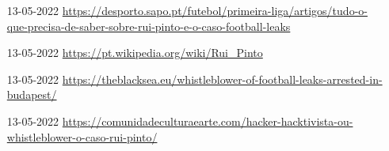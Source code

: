 

\begin{itemize}
    \item [13-05-2022] \url{https://desporto.sapo.pt/futebol/primeira-liga/artigos/tudo-o-que-precisa-de-saber-sobre-rui-pinto-e-o-caso-football-leaks}
    \item [13-05-2022] \url{https://pt.wikipedia.org/wiki/Rui_Pinto}
    \item [13-05-2022] \url{https://theblacksea.eu/whistleblower-of-football-leaks-arrested-in-budapest/}
    \item [13-05-2022] \url{https://comunidadeculturaearte.com/hacker-hacktivista-ou-whistleblower-o-caso-rui-pinto/}
    
\end{itemize}